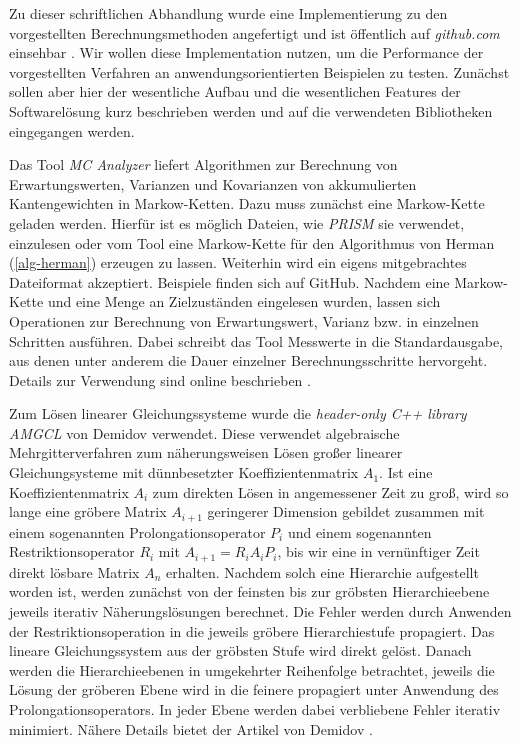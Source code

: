 \documentclass[a4paper]{article}
\newcommand{\mc}{Markow-Kette}
\theoremstyle{nonumberplain}
\begin{document}
Zu dieser schriftlichen Abhandlung wurde eine Implementierung zu den vorgestellten Berechnungsmethoden angefertigt und ist öffentlich auf \textit{github.com} einsehbar \cite{MCA}. Wir wollen diese Implementation nutzen, um die Performance der vorgestellten Verfahren an anwendungsorientierten Beispielen zu testen. Zunächst sollen aber hier der wesentliche Aufbau und die wesentlichen Features der Softwarelösung kurz beschrieben werden und auf die verwendeten Bibliotheken eingegangen werden.


Das Tool \textit{MC Analyzer} \cite{MCA} liefert Algorithmen zur Berechnung von Erwartungswerten, Varianzen und Kovarianzen von akkumulierten Kantengewichten in \mc n.
Dazu muss zunächst eine \mc{} geladen werden. Hierfür ist es möglich Dateien, wie \textit{PRISM} \cite{PRISMCS} sie verwendet, einzulesen oder vom Tool eine \mc{} für den Algorithmus von Herman (\ref{alg-herman}) erzeugen zu lassen. Weiterhin wird ein eigens mitgebrachtes Dateiformat akzeptiert. Beispiele finden sich auf GitHub. Nachdem eine \mc{} und eine Menge an Zielzuständen eingelesen wurden, lassen sich Operationen zur Berechnung von Erwartungswert, Varianz bzw. \cov{} in einzelnen Schritten ausführen. Dabei schreibt das Tool Messwerte in die Standardausgabe, aus denen unter anderem die Dauer einzelner Berechnungsschritte hervorgeht. Details zur Verwendung sind online beschrieben \cite{MCA}.


Zum Lösen linearer Gleichungssysteme wurde die \textit{header-only C++ library AMGCL} von Demidov \cite{Demidov2019} verwendet. Diese verwendet algebraische Mehrgitterverfahren zum näherungsweisen Lösen großer linearer Gleichungsysteme mit dünnbesetzter Koeffizientenmatrix $A_1$. 
Ist eine Koeffizientenmatrix $A_i$ zum direkten Lösen in angemessener Zeit zu groß, wird so lange eine gröbere Matrix $A_{i+1}$ geringerer Dimension gebildet zusammen mit einem sogenannten Prolongationsoperator $P_i$ und einem sogenannten Restriktionsoperator $R_i$ mit $A_{i+1} = R_iA_iP_i$, bis wir eine in vernünftiger Zeit direkt lösbare Matrix $A_n$ erhalten. Nachdem solch eine Hierarchie aufgestellt worden ist, werden zunächst von der feinsten bis zur gröbsten Hierarchieebene jeweils iterativ Näherungslösungen berechnet. Die Fehler werden durch Anwenden der Restriktionsoperation in die jeweils gröbere Hierarchiestufe propagiert. Das lineare Gleichungssystem aus der gröbsten Stufe wird direkt gelöst. Danach werden die Hierarchieebenen in umgekehrter Reihenfolge betrachtet, jeweils die Lösung der gröberen Ebene wird in die feinere propagiert unter Anwendung des Prolongationsoperators. In jeder Ebene werden dabei verbliebene Fehler iterativ minimiert. Nähere Details bietet der Artikel von Demidov \cite{Demidov2019}.
\end{document}
